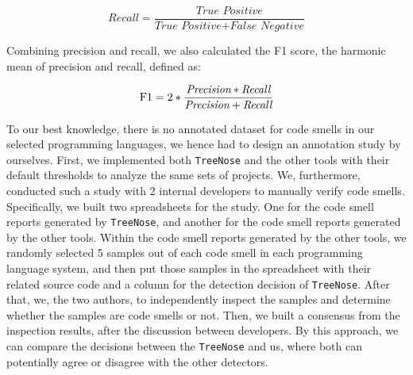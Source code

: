 \begin{equation}
    \textit{Recall} = \frac{\textit{True Positive}}{\textit{True Positive} + \textit{False Negative}}
\end{equation}

Combining precision and recall, we also calculated the F1 score, the harmonic
mean of precision and recall, defined as:


\begin{equation}
    \textnormal{F1} = 2 * \frac{\textit{Precision} * \textit{Recall}}{\textit{Precision} + \textit{Recall}}
\end{equation}



To our best knowledge, there is no annotated dataset for code smells in our
selected programming languages, we hence had to design an annotation study by
ourselves. First, we implemented both \texttt{TreeNose} and the other tools
with their default thresholds to analyze the same sets of projects. We,
furthermore, conducted such a study with 2 internal developers to manually
verify code smells. Specifically, we built two spreadsheets for the study. One
for the code smell reports generated by \texttt{TreeNose}, and another for the
code smell reports generated by the other tools. Within the code smell reports
generated by the other tools, we randomly selected 5 samples out of each code
smell in each programming language system, and then put those samples in the
spreadsheet with their related source code and a column for the detection
decision of \texttt{TreeNose}. After that, we, the two authors, to %
independently inspect the samples and determine whether the samples are code
smells or not. Then, we built a consensus from the inspection results, after
the discussion between developers. By this approach, we can compare the
decisions between the \texttt{TreeNose} and us, where both can
potentially agree or disagree with the other detectors.

